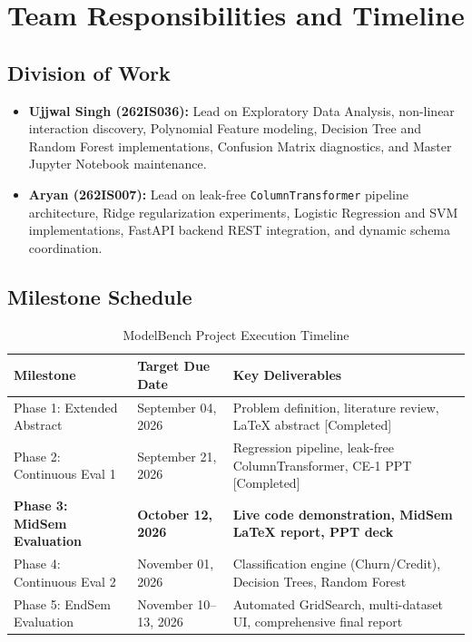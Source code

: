 \documentclass[11pt,a4paper]{article}
\begin{document}
\section{Team Responsibilities and Timeline}
\label{sec:team}

\subsection{Division of Work}
\begin{itemize}[leftmargin=*,itemsep=2pt]
    \item \textbf{Ujjwal Singh (262IS036):} Lead on Exploratory Data Analysis, non-linear interaction discovery, Polynomial Feature modeling, Decision Tree and Random Forest implementations, Confusion Matrix diagnostics, and Master Jupyter Notebook maintenance.
    \item \textbf{Aryan (262IS007):} Lead on leak-free \texttt{ColumnTransformer} pipeline architecture, Ridge regularization experiments, Logistic Regression and SVM implementations, FastAPI backend REST integration, and dynamic schema coordination.
\end{itemize}

\subsection{Milestone Schedule}
\begin{table}[h!]
\centering
\small
\caption{ModelBench Project Execution Timeline}
\label{tab:timeline}
\begin{tabular}{lll}
\toprule
\textbf{Milestone} & \textbf{Target Due Date} & \textbf{Key Deliverables} \\
\midrule
Phase 1: Extended Abstract & September 04, 2026 & Problem definition, literature review, LaTeX abstract [Completed] \\
Phase 2: Continuous Eval 1 & September 21, 2026 & Regression pipeline, leak-free ColumnTransformer, CE-1 PPT [Completed] \\
\textbf{Phase 3: MidSem Evaluation} & \textbf{October 12, 2026} & \textbf{Live code demonstration, MidSem LaTeX report, PPT deck} \\
Phase 4: Continuous Eval 2 & November 01, 2026 & Classification engine (Churn/Credit), Decision Trees, Random Forest \\
Phase 5: EndSem Evaluation & November 10--13, 2026 & Automated GridSearch, multi-dataset UI, comprehensive final report \\
\bottomrule
\end{tabular}
\end{table}
\end{document}
